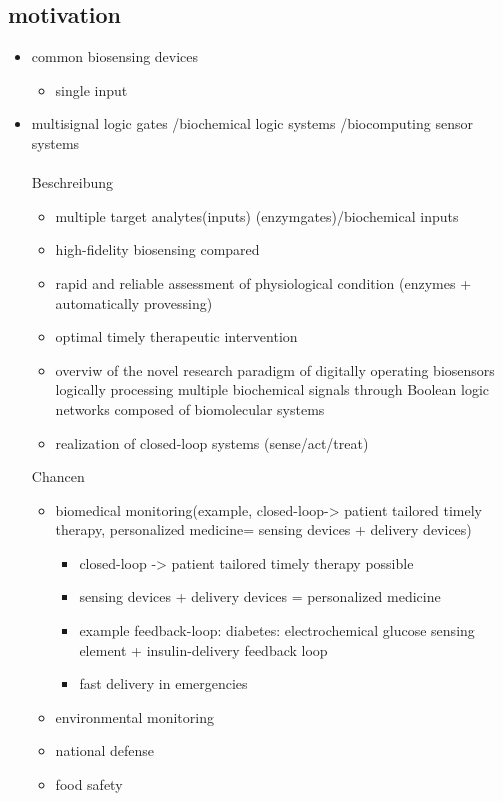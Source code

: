 \documentclass[12pt]{article}
\begin{document}
\subsection{motivation}
\begin{itemize}
	\item common biosensing devices
	\begin{itemize}
		\item single input
	\end{itemize}
\item multisignal logic gates /biochemical logic systems /biocomputing sensor systems\\
\\
Beschreibung
\begin{itemize}
	
	\item multiple target analytes(inputs) (enzymgates)/biochemical inputs 
	\item high-fidelity biosensing compared 
	\item rapid and reliable assessment of physiological condition (enzymes + automatically provessing)
	\item optimal timely therapeutic intervention
	\item overviw of the novel research paradigm of digitally operating biosensors logically processing multiple biochemical signals through Boolean logic networks composed of biomolecular systems 
	\\
	\item realization of closed-loop systems (sense/act/treat)
	
	
\end{itemize}


Chancen
\begin{itemize}
	\item biomedical monitoring(example, closed-loop-> patient tailored timely therapy, personalized medicine= sensing devices + delivery devices)
	\begin{itemize}
		\item closed-loop -> patient tailored timely therapy possible
		\item sensing devices + delivery devices = personalized medicine
		\item example feedback-loop: diabetes: electrochemical glucose sensing element + insulin-delivery feedback loop
		\item fast delivery in emergencies 
	\end{itemize}
	\item environmental monitoring
	\item national defense
	\item food safety
	\\
	
	
\end{itemize}
\end{itemize}
\end{document}
